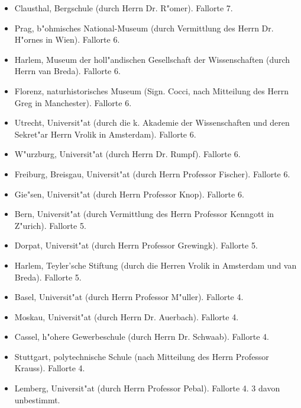 \documentclass[a4paper, 11pt, oneside]{article}
\begin{document}
\begin{itemize}
    \item Clausthal, Bergschule (durch Herrn Dr. R"omer). Fallorte 7.

    \item Prag, b"ohmisches National-Museum (durch Vermittlung des Herrn Dr. H"ornes in Wien). Fallorte 6.

    \item Harlem, Museum der holl"andischen Gesellschaft der Wissenschaften (durch Herrn van Breda). Fallorte 6.

    \item Florenz, naturhistorisches Museum (Sign. Cocci, nach Mitteilung des Herrn Greg in Manchester). Fallorte 6.

    \item Utrecht, Universit"at (durch die k. Akademie der Wissenschaften und deren Sekret"ar Herrn Vrolik in Amsterdam). Fallorte 6.

    \item W"urzburg, Universit"at (durch Herrn Dr. Rumpf). Fallorte 6.

    \item Freiburg, Breisgau, Universit"at (durch Herrn Professor Fischer). Fallorte 6.

    \item Gie"sen, Universit"at (durch Herrn Professor Knop). Fallorte 6.

    \item Bern, Universit"at (durch Vermittlung des Herrn Professor Kenngott in Z"urich). Fallorte 5.

    \item Dorpat, Universit"at (durch Herrn Professor Grewingk). Fallorte 5.

    \item Harlem, Teyler'sche Stiftung (durch die Herren Vrolik in Amsterdam und van Breda). Fallorte 5.

    \item Basel, Universit"at (durch Herrn Professor M"uller). Fallorte 4.

    \item Moskau, Universit"at (durch Herrn Dr. Auerbach). Fallorte 4.

    \item Cassel, h"ohere Gewerbeschule (durch Herrn Dr. Schwaab). Fallorte 4.

    \item Stuttgart, polytechnische Schule (nach Mitteilung des Herrn Professor Krauss). Fallorte 4.

    \item Lemberg, Universit"at (durch Herrn Professor Pebal). Fallorte 4. 3 davon unbestimmt.


\end{itemize}
\end{document}
